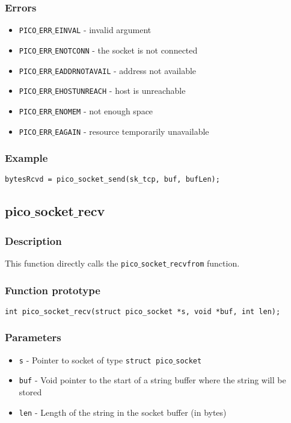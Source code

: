 \subsubsection*{Errors}
\begin{itemize}[noitemsep]
\item \texttt{PICO$\_$ERR$\_$EINVAL} - invalid argument
\item \texttt{PICO$\_$ERR$\_$ENOTCONN} - the socket is not connected
\item \texttt{PICO$\_$ERR$\_$EADDRNOTAVAIL} - address not available
\item \texttt{PICO$\_$ERR$\_$EHOSTUNREACH} - host is unreachable
\item \texttt{PICO$\_$ERR$\_$ENOMEM} - not enough space
\item \texttt{PICO$\_$ERR$\_$EAGAIN} - resource temporarily unavailable
\end{itemize}

\subsubsection*{Example}
\begin{verbatim}
bytesRcvd = pico_socket_send(sk_tcp, buf, bufLen);
\end{verbatim}


\subsection{pico$\_$socket$\_$recv}

\subsubsection*{Description}
This function directly calls the \texttt{pico$\_$socket$\_$recvfrom} function.

\subsubsection*{Function prototype}
\begin{verbatim}
int pico_socket_recv(struct pico_socket *s, void *buf, int len);
\end{verbatim}

\subsubsection*{Parameters}
\begin{itemize}[noitemsep]
\item \texttt{s} - Pointer to socket of type \texttt{struct pico$\_$socket}
\item \texttt{buf} - Void pointer to the start of a string buffer where the string will be stored
\item \texttt{len} - Length of the string in the socket buffer (in bytes)
\end{itemize}

